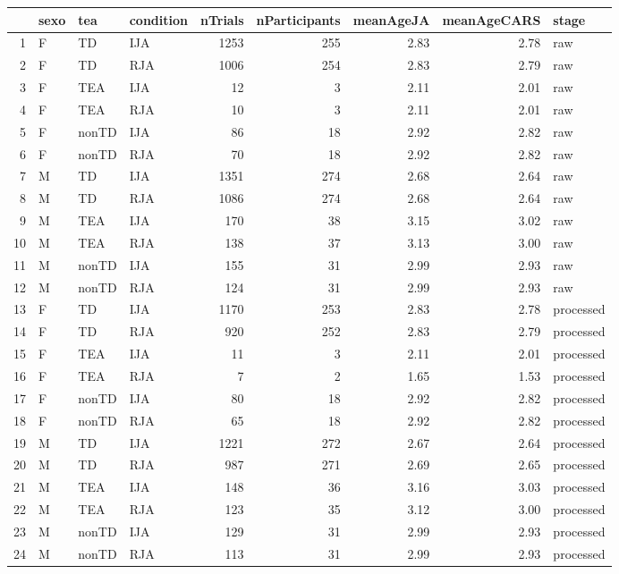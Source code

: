 \documentclass{article}
\begin{document}
\begin{table}[ht]
\centering
\begin{tabular}{rlllrrrrl}
  \hline
 & sexo & tea & condition & nTrials & nParticipants & meanAgeJA & meanAgeCARS & stage \\ 
  \hline
1 & F & TD & IJA & 1253 & 255 & 2.83 & 2.78 & raw \\ 
  2 & F & TD & RJA & 1006 & 254 & 2.83 & 2.79 & raw \\ 
  3 & F & TEA & IJA &  12 &   3 & 2.11 & 2.01 & raw \\ 
  4 & F & TEA & RJA &  10 &   3 & 2.11 & 2.01 & raw \\ 
  5 & F & nonTD & IJA &  86 &  18 & 2.92 & 2.82 & raw \\ 
  6 & F & nonTD & RJA &  70 &  18 & 2.92 & 2.82 & raw \\ 
  7 & M & TD & IJA & 1351 & 274 & 2.68 & 2.64 & raw \\ 
  8 & M & TD & RJA & 1086 & 274 & 2.68 & 2.64 & raw \\ 
  9 & M & TEA & IJA & 170 &  38 & 3.15 & 3.02 & raw \\ 
  10 & M & TEA & RJA & 138 &  37 & 3.13 & 3.00 & raw \\ 
  11 & M & nonTD & IJA & 155 &  31 & 2.99 & 2.93 & raw \\ 
  12 & M & nonTD & RJA & 124 &  31 & 2.99 & 2.93 & raw \\ 
  13 & F & TD & IJA & 1170 & 253 & 2.83 & 2.78 & processed \\ 
  14 & F & TD & RJA & 920 & 252 & 2.83 & 2.79 & processed \\ 
  15 & F & TEA & IJA &  11 &   3 & 2.11 & 2.01 & processed \\ 
  16 & F & TEA & RJA &   7 &   2 & 1.65 & 1.53 & processed \\ 
  17 & F & nonTD & IJA &  80 &  18 & 2.92 & 2.82 & processed \\ 
  18 & F & nonTD & RJA &  65 &  18 & 2.92 & 2.82 & processed \\ 
  19 & M & TD & IJA & 1221 & 272 & 2.67 & 2.64 & processed \\ 
  20 & M & TD & RJA & 987 & 271 & 2.69 & 2.65 & processed \\ 
  21 & M & TEA & IJA & 148 &  36 & 3.16 & 3.03 & processed \\ 
  22 & M & TEA & RJA & 123 &  35 & 3.12 & 3.00 & processed \\ 
  23 & M & nonTD & IJA & 129 &  31 & 2.99 & 2.93 & processed \\ 
  24 & M & nonTD & RJA & 113 &  31 & 2.99 & 2.93 & processed \\ 

\end{tabular}
\end{table}
\end{document}

